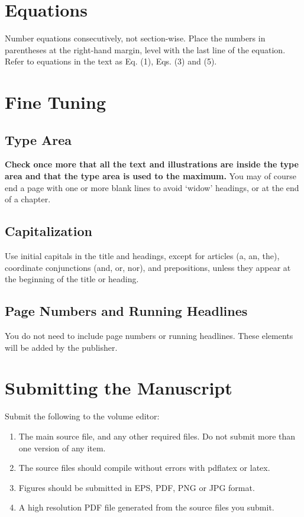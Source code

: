 \documentclass{IOS-Book-Article}
\begin{document}
\section{Equations}
Number equations consecutively, not section-wise. Place the numbers in parentheses at
the right-hand margin, level with the last line of the equation. Refer to equations in the
text as Eq. (1), Eqs. (3) and (5).

\section{Fine Tuning}

\subsection{Type Area}
\textbf{Check once more that all the text and illustrations are inside the type area and
that the type area is used to the maximum.} You may of course end a page with one
or more blank lines to avoid `widow' headings, or at the end of a chapter.

\subsection{Capitalization}
Use initial capitals in the title and headings, except for articles (a, an, the), coordinate
conjunctions (and, or, nor), and prepositions, unless they appear at the beginning of the
title or heading.

\subsection{Page Numbers and Running Headlines}
You do not need to include page numbers or running headlines. These elements will be
added by the publisher.

\section{Submitting the Manuscript}
Submit the following to the volume editor:

\begin{enumerate}
\item The main source file, and any other required files. Do not submit more than
one version of any item.

\item The source files should compile without errors with pdflatex or latex.

\item Figures should be submitted in EPS, PDF, PNG or JPG format.

\item A high resolution PDF file generated from the source files you submit.
\end{enumerate}
\end{document}
